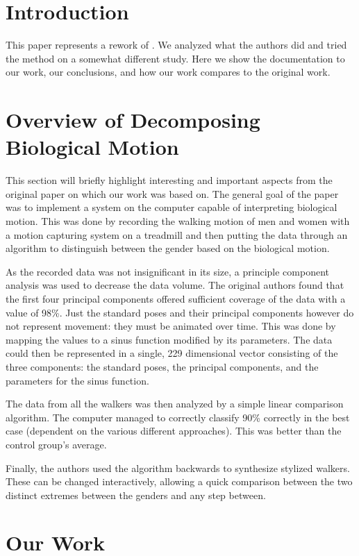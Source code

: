 \documentclass[a4paper]{article}
\begin{document}
\section{Introduction}

This paper represents a rework of \cite{origin}.
We analyzed what the authors did and tried the method on a somewhat different study.
Here we show the documentation to our work, our conclusions, and how our work compares to the original work.

\section{Overview of Decomposing Biological Motion}

This section will briefly highlight interesting and important aspects from the original paper on which our work was based on.
The general goal of the paper was to implement a system on the computer capable of interpreting biological motion.
This was done by recording the walking motion of men and women with a motion capturing system on a treadmill and then putting the data through an algorithm to distinguish between the gender based on the biological motion.

As the recorded data was not insignificant in its size, a principle component analysis was used to decrease the data volume.
The original authors found that the first four principal components offered sufficient coverage of the data with a value of 98\%.
Just the standard poses and their principal components however do not represent movement: they must be animated over time.
This was done by mapping the values to a sinus function modified by its parameters.
The data could then be represented in a single, 229 dimensional vector consisting of the three components: the standard poses, the principal components, and the parameters for the sinus function.

The data from all the walkers was then analyzed by a simple linear comparison algorithm.
The computer managed to correctly classify 90\% correctly in the best case (dependent on the various different approaches).
This was better than the control group's average.

Finally, the authors used the algorithm backwards to synthesize stylized walkers.
These can be changed interactively, allowing a quick comparison between the two distinct extremes between the genders and any step between.

\section{Our Work}
\end{document}
